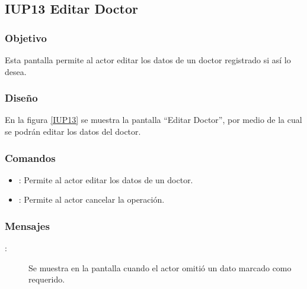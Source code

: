 \subsection{IUP13 Editar Doctor}
 
\subsubsection{Objetivo}

    Esta pantalla permite al actor editar los datos de un doctor registrado si así lo desea.

\subsubsection{Diseño}

    En la figura \ref{IUP13} se muestra la pantalla ``Editar Doctor'', por medio de la cual se podrán editar los datos del doctor. \\


\subsubsection{Comandos}
\begin{itemize}
    \item {}: Permite al actor editar los datos de un doctor.
    \item {}: Permite al actor cancelar la operación.
    
\end{itemize}

\subsubsection{Mensajes}

\begin{description}
    \item[:] Se muestra en la pantalla  cuando el actor omitió un dato marcado como requerido.
    
\end{description}
